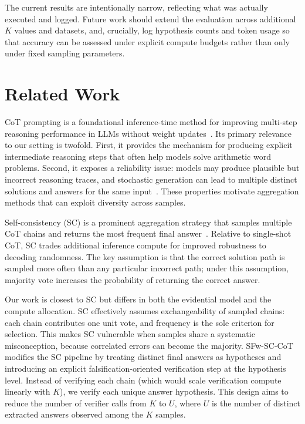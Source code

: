 \documentclass[journal,article,accept,pdftex,moreauthors]{Definitions/mdpi}
\begin{document}
The current results are intentionally narrow, reflecting what was actually executed and logged. Future work should extend the evaluation across additional $K$ values and datasets, and, crucially, log hypothesis counts and token usage so that accuracy can be assessed under explicit compute budgets rather than only under fixed sampling parameters.

\section{Related Work}

CoT prompting is a foundational inference-time method for improving multi-step reasoning performance in LLMs without weight updates~\cite{wei-2022-chain}. Its primary relevance to our setting is twofold. First, it provides the mechanism for producing explicit intermediate reasoning steps that often help models solve arithmetic word problems. Second, it exposes a reliability issue: models may produce plausible but incorrect reasoning traces, and stochastic generation can lead to multiple distinct solutions and answers for the same input~\cite{wei-2022-chain}. These properties motivate aggregation methods that can exploit diversity across samples.

Self-consistency (SC) is a prominent aggregation strategy that samples multiple CoT chains and returns the most frequent final answer~\cite{das-2022-self}. Relative to single-shot CoT, SC trades additional inference compute for improved robustness to decoding randomness. The key assumption is that the correct solution path is sampled more often than any particular incorrect path; under this assumption, majority vote increases the probability of returning the correct answer.

Our work is closest to SC but differs in both the evidential model and the compute allocation. SC effectively assumes exchangeability of sampled chains: each chain contributes one unit vote, and frequency is the sole criterion for selection. This makes SC vulnerable when samples share a systematic misconception, because correlated errors can become the majority. SFw-SC-CoT modifies the SC pipeline by treating distinct final answers as hypotheses and introducing an explicit falsification-oriented verification step at the hypothesis level. Instead of verifying each chain (which would scale verification compute linearly with $K$), we verify each unique answer hypothesis. This design aims to reduce the number of verifier calls from $K$ to $U$, where $U$ is the number of distinct extracted answers observed among the $K$ samples.
\end{document}
